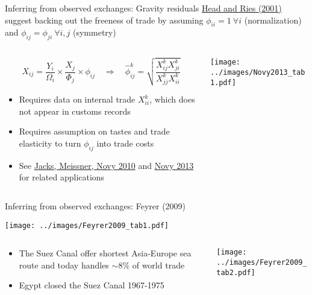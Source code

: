 \documentclass[10pt,notes=hide,aspectratio=169]{beamer}
\begin{document}
\begin{frame}{Inferring from observed exchanges: Gravity residuals}
\href{https://www.aeaweb.org/articles?id=10.1257/aer.91.4.858}{Head and Ries (2001)} suggest backing out the freeness of trade by assuming
$\phi_{ii}=1 \ \forall i$ (normalization) and $\phi_{ij}=\phi_{ji} \ \forall i,j$ (symmetry)
\begin{columns}
\begin{column}{.52\textwidth}
\begin{equation*}
X_{ij} = {\frac{Y_i}{\Omega_i}} \times {\frac{X_j}{\Phi_j}} \times \phi_{ij}
\quad \Rightarrow \quad
\hat{\phi}^k_{ij}=\sqrt{\frac{X^k_{ij}X^k_{ji}}{X^k_{jj}X^k_{ii}}}
\end{equation*}
\begin{itemize}
	\item Requires data on internal trade $X_{ii}^k$, which does not appear in customs records
	\item Requires assumption on tastes and trade elasticity to turn $\phi_{ij}$ into trade costs
	\item See \href{https://doi.org/10.1016/j.eeh.2009.07.001}{Jacks, Meissner, Novy 2010} and \href{https://doi.org/10.1111/j.1465-7295.2011.00439.x}{Novy 2013} for related applications
\end{itemize}
\end{column}
\begin{column}{.45\textwidth}
\texttt{[image: ../images/Novy2013\_tab1.pdf]}
\end{column}
\end{columns}
\end{frame}
\begin{frame}{Inferring from observed exchanges: Feyrer (2009)}
\begin{center}
\texttt{[image: ../images/Feyrer2009\_tab1.pdf]}
\end{center}
\vspace{-5mm}
\begin{columns}
\begin{column}{.62\textwidth}
\begin{itemize}
	\item The Suez Canal offer shortest Asia-Europe sea route and today handles $\sim 8\%$ of world trade
	\item Egypt closed the Suez Canal 1967-1975
\end{itemize}
\end{column}
\begin{column}{.36\textwidth}
\texttt{[image: ../images/Feyrer2009\_tab2.pdf]}
\end{column}
\end{columns}
\end{frame}
\end{document}
